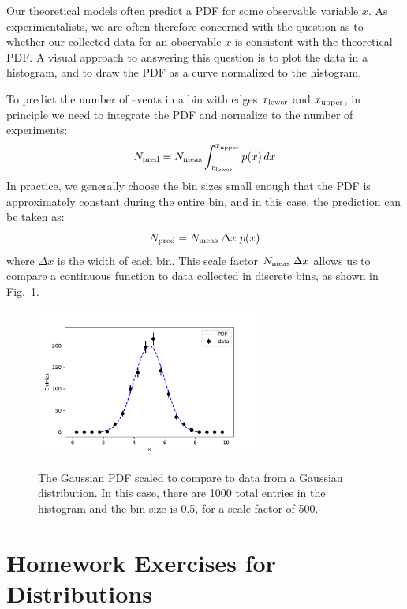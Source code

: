 \documentclass[12pt,oneside]{book}
\begin{document}
Our theoretical models often predict a PDF for some observable variable $x$.  As experimentalists, we are often therefore concerned with the question as to whether our collected data for an observable $x$ is consistent with the theoretical PDF.  A visual approach to answering this question is to plot the data in a histogram, and to draw the PDF as a curve normalized to the histogram.

To predict the number of events in a bin with edges $x_{\rm lower}$ and $x_{\rm upper}$, in principle we need to integrate the PDF and normalize to the number of experiments:
\begin{displaymath}
N_{\rm pred} = N_{\rm meas} \int^{x_{\rm upper}}_{x_{\rm lower}} p(x) \, dx
\end{displaymath}
In practice, we generally choose the bin sizes small enough that the PDF is approximately constant during the entire bin, and in this case, the prediction can be taken as:
\begin{displaymath}
N_{\rm pred} = N_{\rm meas} \; \Delta x \; p(x)
\end{displaymath}
where $\Delta x$ is the width of each bin.  This scale factor $N_{\rm meas} \; \Delta x$ allows us to compare a continuous function to data collected in discrete bins, as shown in Fig.~\ref{fig:histpdf}.

\begin{figure}[htbp]
\begin{center}
{\includegraphics[width=0.65\textwidth]{figs/compare.pdf}}
\end{center}
\caption{\label{fig:histpdf} The Gaussian PDF scaled to compare to data from a Gaussian distribution.
In this case, there are 1000 total entries in the histogram and the bin size is 0.5, for a scale factor of 500.
}
\end{figure}

\newpage
\section{Homework Exercises for Distributions}
\end{document}
